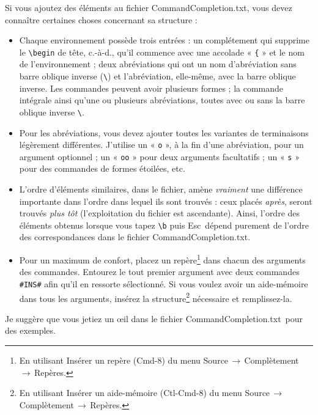 \documentclass[11pt,french]{article}
\newcommand{\ctlkey}{\textsf{Ctl}}
\newcommand{\cmdkey}{\textsf{Cmd}}
\newcommand{\esckey}{\textsf{Esc}}
\newcommand{\mnu}[1]{\textsf{#1}}
\newcommand{\To}{\,\(\to\)\,}
\newcommand{\CCT}{\textsf{CommandCompletion.txt}}
\begin{document}
Si vous ajoutez des éléments au fichier \CCT{}, vous devez connaître certaines choses concernant sa structure :
\begin{itemize}
\item Chaque environnement possède trois entrées : un complétement qui supprime le \verb|\begin| de tête, c.-à-d., qu'il commence avec une accolade « \texttt{\{} » et le nom de l'environnement ; deux abréviations qui ont un nom d'abréviation sans barre oblique inverse (\verb|\|) et l'abréviation, elle-même, avec la barre oblique inverse. Les commandes peuvent avoir plusieurs formes ; la commande intégrale ainsi qu'une ou plusieurs abréviations, toutes avec ou sans la barre oblique inverse \verb|\|.
\item Pour les abréviations, vous devez ajouter toutes les variantes de terminaisons légèrement différentes. J'utilise 
un « \texttt{o} », à la fin d'une abréviation, pour un argument optionnel ; un « \texttt{oo} » pour deux arguments facultatifs ; un « \texttt{s} » pour des commandes de formes étoilées, etc.
\item L'ordre d'éléments similaires, dans le fichier, amène \emph{vraiment} une différence importante dans l'ordre dans lequel ils sont trouvés : ceux placés \emph{après}, seront trouvés \emph{plus tôt} (l'exploitation du fichier est ascendante). Ainsi, l'ordre des éléments obtenus lorsque vous tapez \verb|\b| puis \esckey\ dépend purement de l'ordre des correspondances dans le fichier \CCT.
\item Pour un maximum de confort, placez un repère\footnote{En utilisant \mnu{Insérer un repère} (\cmdkey-\textsf{8}) du menu \mnu{Source}\To\mnu{Complètement}\To\mnu{Repères}.} dans chacun des arguments des commandes. Entourez le tout premier argument avec deux commandes \verb|#INS#| afin qu'il en ressorte sélectionné. Si vous voulez avoir un aide-mémoire dans tous les arguments, insérez la structure\footnote{En utilisant \mnu{Insérer un aide-mémoire} (\ctlkey-\cmdkey-\textsf{8}) du menu \mnu{Source}\To\mnu{Complètement}\To\mnu{Repères}.} nécessaire et remplissez-la.
\end{itemize}%

Je suggère que vous jetiez un \oe{}il dans le fichier \CCT\ pour des exemples.
\end{document}
